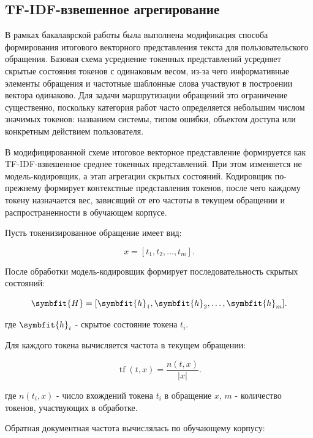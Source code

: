 \documentclass[14pt,a4paper]{extarticle}
\numberwithin{figure}{section}
\numberwithin{table}{section}
\begin{document}
\subsection{TF-IDF-взвешенное агрегирование}

В рамках бакалаврской работы была выполнена модификация способа
формирования итогового векторного представления текста для пользовательского
обращения. Базовая схема усреднение токенных представлений усредняет скрытые состояния
токенов с одинаковым весом, из-за чего информативные элементы обращения
и частотные шаблонные слова участвуют в построении вектора одинаково.
Для задачи маршрутизации обращений это ограничение существенно,
поскольку категория работ часто определяется небольшим числом значимых
токенов: названием системы, типом ошибки, объектом доступа или
конкретным действием пользователя.

В модифицированной схеме итоговое векторное представление формируется как
TF-IDF-взвешенное среднее токенных представлений. При этом изменяется не
модель-кодировщик, а этап агрегации скрытых состояний. Кодировщик по-прежнему
формирует контекстные представления токенов, после чего каждому токену
назначается вес, зависящий от его частоты в текущем обращении и
распространенности в обучающем корпусе.

Пусть токенизированное обращение имеет вид:

\begin{equation}x=[t_1,t_2,\ldots,t_m].\label{eq:tokenized-query}\end{equation}

После обработки модель-кодировщик формирует последовательность скрытых
состояний:

\begin{equation}\symbfit{H}=[\symbfit{h}_1,\symbfit{h}_2,\ldots,\symbfit{h}_m].\end{equation}

где \(\symbfit{h}_i\) - скрытое состояние токена \(t_i\).

Для каждого токена вычисляется частота в текущем обращении:

\begin{equation}\operatorname{tf}(t,x)=\frac{n(t,x)}{|x|}.\label{eq:tf}\end{equation}

где \(n(t_i,x)\) - число вхождений токена \(t_i\) в обращение \(x\), \(m\) -
количество токенов, участвующих в обработке.

Обратная документная частота вычислялась по обучающему корпусу:
\end{document}
